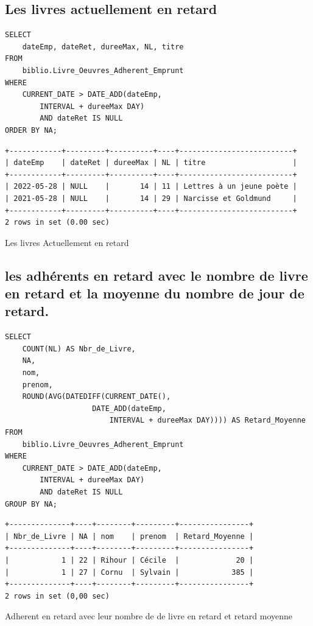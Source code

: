 \documentclass{article}
\begin{document}
\subsection{Les livres actuellement en retard}
\begin{center}
\begin{minipage}{0.75\linewidth}
\begin{listing}[H]
\begin{verbatim}
SELECT 
    dateEmp, dateRet, dureeMax, NL, titre
FROM
    biblio.Livre_Oeuvres_Adherent_Emprunt
WHERE
    CURRENT_DATE > DATE_ADD(dateEmp,
        INTERVAL + dureeMax DAY)
        AND dateRet IS NULL
ORDER BY NA;
\end{verbatim}
\begin{verbatim}
+------------+---------+----------+----+--------------------------+
| dateEmp    | dateRet | dureeMax | NL | titre                    |
+------------+---------+----------+----+--------------------------+
| 2022-05-28 | NULL    |       14 | 11 | Lettres à un jeune poète |
| 2021-05-28 | NULL    |       14 | 29 | Narcisse et Goldmund     |
+------------+---------+----------+----+--------------------------+
2 rows in set (0.00 sec)
\end{verbatim}
\caption{Les livres Actuellement en retard}
\end{listing}
\end{minipage}
\end{center}

\subsection{les adhérents en retard avec le nombre de livre en retard et la moyenne du nombre de jour de retard.}
\begin{center}
\begin{minipage}{0.8\linewidth}
\begin{listing}[H]
\begin{verbatim}
SELECT 
    COUNT(NL) AS Nbr_de_Livre,
    NA,
    nom,
    prenom,
    ROUND(AVG(DATEDIFF(CURRENT_DATE(),
                    DATE_ADD(dateEmp,
                        INTERVAL + dureeMax DAY)))) AS Retard_Moyenne
FROM
    biblio.Livre_Oeuvres_Adherent_Emprunt
WHERE
    CURRENT_DATE > DATE_ADD(dateEmp,
        INTERVAL + dureeMax DAY)
        AND dateRet IS NULL
GROUP BY NA;
\end{verbatim}
\begin{verbatim}
+--------------+----+--------+---------+----------------+
| Nbr_de_Livre | NA | nom    | prenom  | Retard_Moyenne |
+--------------+----+--------+---------+----------------+
|            1 | 22 | Rihour | Cécile  |             20 |
|            1 | 27 | Cornu  | Sylvain |            385 |
+--------------+----+--------+---------+----------------+
2 rows in set (0,00 sec)
\end{verbatim}
\caption{Adherent en retard avec leur nombre de de livre en retard et retard moyenne}
\end{listing}
\end{minipage}
\end{center}
\end{document}
